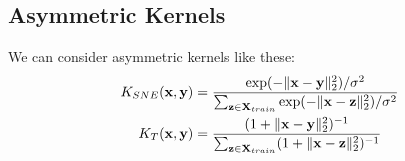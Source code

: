 \subsection{Asymmetric Kernels}
We can consider asymmetric kernels like these:
\begin{align*}
	K_{SNE}({\mathbf{x}}, {\mathbf{y}}) &= \frac{\exp(-\|{\mathbf{x}}-{\mathbf{y}}\|_2^2)/\sigma^2}{\sum_{{\mathbf{z}}\in\mathbf{X}_{train}}\exp(-\|{\mathbf{x}}-{\mathbf{z}}\|_2^2)/\sigma^2}\\
	K_{T}({\mathbf{x}}, {\mathbf{y}}) &= \frac{(1+\|{\mathbf{x}}-{\mathbf{y}}\|_2^2)^{-1}}{\sum_{{\mathbf{z}}\in\mathbf{X}_{train}}(1+\|{\mathbf{x}}-{\mathbf{z}}\|_2^2)^{-1}}
\end{align*}


